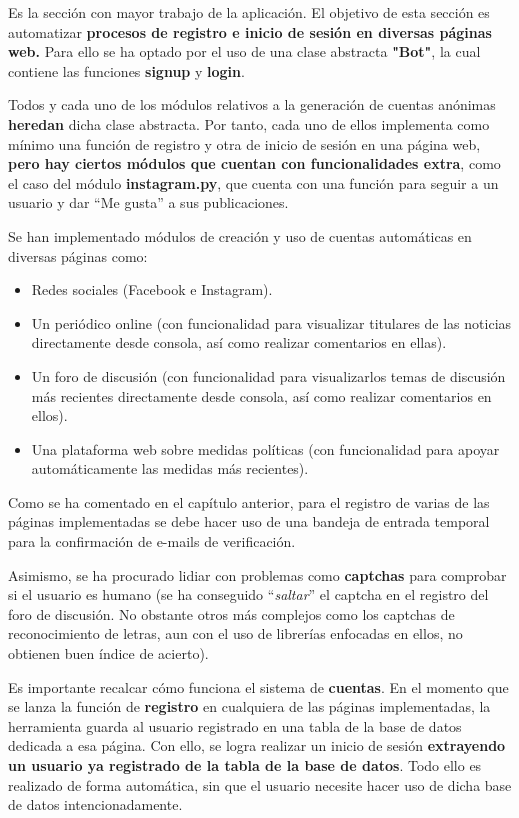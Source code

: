 Es la sección con mayor trabajo de la aplicación. El objetivo de esta sección es automatizar \textbf{procesos de registro e inicio de sesión en diversas páginas web.}
Para ello se ha optado por el uso de una clase abstracta \textbf{"Bot"}, la cual contiene las funciones \textbf{signup} y \textbf{login}.

Todos y cada uno de los módulos relativos a la generación de cuentas anónimas \textbf{heredan} dicha clase abstracta. Por tanto, cada uno de ellos implementa como mínimo una función de registro y otra de inicio de sesión en una página web, \textbf{pero hay ciertos módulos que cuentan con funcionalidades extra}, como el caso del módulo \textbf{instagram.py}, que cuenta con una función para seguir a un usuario y dar ``Me gusta'' a sus publicaciones. 

Se han implementado módulos de creación y uso de cuentas automáticas en diversas páginas como:

\begin{itemize}
	\item Redes sociales (Facebook e Instagram).
	\item Un periódico online (con funcionalidad para visualizar titulares de las noticias directamente desde consola, así como realizar comentarios en ellas).
	\item Un foro de discusión (con funcionalidad para visualizarlos temas de discusión más recientes directamente desde consola, así como realizar comentarios en ellos).
	\item Una plataforma web sobre medidas políticas (con funcionalidad para apoyar automáticamente las medidas más recientes).
\end{itemize}

Como se ha comentado en el capítulo anterior, para el registro de varias de las páginas implementadas se debe hacer uso de una bandeja de entrada temporal para la confirmación de e-mails de verificación.
 
Asimismo, se ha procurado lidiar con problemas como \textbf{captchas} para comprobar si el usuario es humano (se ha conseguido ``\textit{saltar}'' el captcha en el registro del foro de discusión. No obstante otros más complejos como los captchas de reconocimiento de letras, aun con el uso de librerías enfocadas en ellos, no obtienen buen índice de acierto). 

Es importante recalcar cómo funciona el sistema de \textbf{cuentas}. En el momento que se lanza la función de \textbf{registro} en cualquiera de las páginas implementadas, la herramienta guarda al usuario registrado en una tabla de la base de datos dedicada a esa página. Con ello, se logra realizar un inicio de sesión \textbf{extrayendo un usuario ya registrado de la tabla de la base de datos}. Todo ello es realizado de forma automática, sin que el usuario necesite hacer uso de dicha base de datos intencionadamente.

